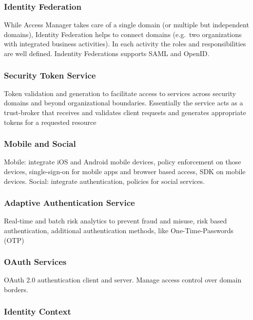 \subsubsection{Identity Federation}

While Access Manager takes care of a single domain (or multiple but independent domains), Identity Federation helps to connect domains (e.g.\ two organizations with integrated business activities). In each activity the roles and responsibilities are well defined. Indentity Federations supports SAML and OpenID.

\subsubsection{Security Token Service}

Token validation and generation to facilitate access to services across security domains and beyond organizational boundaries. Essentially the service acts as a trust-broker that receives and validates client requests and generates appropriate tokens for a requested resource

\subsubsection{Mobile and Social}

Mobile: integrate iOS and Android mobile devices, policy enforcement on those devices, single-sign-on for mobile apps and browser based access, SDK on mobile devices. Social: integrate authentication, policies for social services.


\subsubsection{Adaptive Authentication Service}

Real-time and batch risk analytics to prevent fraud and misuse, risk based authentication, additional authentication methods, like One-Time-Passwords (OTP)


\subsubsection{OAuth Services}

OAuth 2.0 authentication client and server. Manage access control over domain borders.


\subsubsection{Identity Context}

